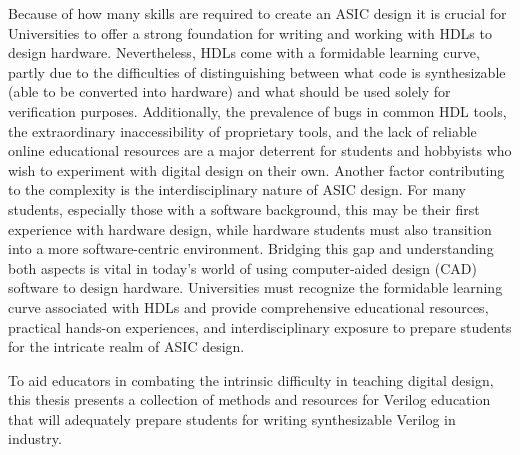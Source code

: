 Because of how many skills are required to create an ASIC design it is crucial for Universities to offer a strong foundation for writing and working with HDLs to design hardware. Nevertheless, HDLs come with a formidable learning curve, partly due to the difficulties of distinguishing between what code is synthesizable (able to be converted into hardware) and what should be used solely for verification purposes. Additionally, the prevalence of bugs in common HDL tools, the extraordinary inaccessibility of proprietary tools, and the lack of reliable online educational resources are a major deterrent for students and hobbyists who wish to experiment with digital design on their own. Another factor contributing to the complexity is the interdisciplinary nature of ASIC design. For many students, especially those with a software background, this may be their first experience with hardware design, while hardware students must also transition into a more software-centric environment. Bridging this gap and understanding both aspects is vital in today's world of using computer-aided design (CAD) software to design hardware. Universities must recognize the formidable learning curve associated with HDLs and provide comprehensive educational resources, practical hands-on experiences, and interdisciplinary exposure to prepare students for the intricate realm of ASIC design.

To aid educators in combating the intrinsic difficulty in teaching digital design, this thesis presents a collection of methods and resources for Verilog education that will adequately prepare students for writing synthesizable Verilog in industry.

